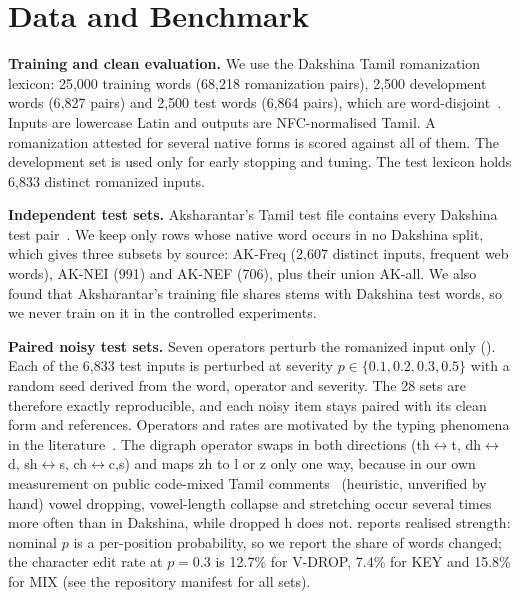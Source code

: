 \section{Data and Benchmark}
\label{sec:data}

\textbf{Training and clean evaluation.}
We use the Dakshina Tamil romanization lexicon: 25{,}000 training words (68{,}218 romanization pairs), 2{,}500 development words (6{,}827 pairs) and 2{,}500 test words (6{,}864 pairs), which are word-disjoint~\cite{roark2020dakshina}.
Inputs are lowercase Latin and outputs are NFC-normalised Tamil.
A romanization attested for several native forms is scored against all of them.
The development set is used only for early stopping and tuning.
The test lexicon holds 6{,}833 distinct romanized inputs.

\textbf{Independent test sets.}
Aksharantar's Tamil test file contains every Dakshina test pair~\cite{madhani2023aksharantar}.
We keep only rows whose native word occurs in no Dakshina split, which gives three subsets by source: AK-Freq (2{,}607 distinct inputs, frequent web words), AK-NEI (991) and AK-NEF (706), plus their union AK-all.
We also found that Aksharantar's training file shares stems with Dakshina test words, so we never train on it in the controlled experiments.

\textbf{Paired noisy test sets.}
Seven operators perturb the romanized input only ().
Each of the 6{,}833 test inputs is perturbed at severity $p\in\{0.1,0.2,0.3,0.5\}$ with a random seed derived from the word, operator and severity.
The 28 sets are therefore exactly reproducible, and each noisy item stays paired with its clean form and references.
Operators and rates are motivated by the typing phenomena in the literature~\cite{wolfsonkin2019latin,herath2024tamzhi,belinkov2018synthetic}.
The digraph operator swaps in both directions (th$\leftrightarrow$t, dh$\leftrightarrow$d, sh$\leftrightarrow$s, ch$\leftrightarrow$c,s) and maps zh to l or z only one way, because in our own measurement on public code-mixed Tamil comments~\cite{chakravarthi2020tamilmix} (heuristic, unverified by hand) vowel dropping, vowel-length collapse and stretching occur several times more often than in Dakshina, while dropped h does not.
 reports realised strength: nominal $p$ is a per-position probability, so we report the share of words changed; the character edit rate at $p{=}0.3$ is 12.7\% for V-DROP, 7.4\% for KEY and 15.8\% for MIX (see the repository manifest for all sets).

\begin{table}[t]
\caption{Noise operators and the share of test words they change (\%) at three severities.}
\label{tab:ops}
\centering\footnotesize
\resizebox{\columnwidth}{!}{}
\end{table}

